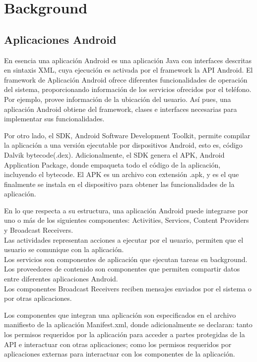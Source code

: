 \section{Background}
\label{sec:back}

\subsection{Aplicaciones Android}
En esencia una aplicación Android es una aplicación Java con interfaces
descritas en sintaxis XML, cuya ejecución es activada por el framework la API
Android.\newline 
El framework de Aplicación Android ofrece diferentes funcionalidades de
operación del sistema, proporcionando información de los servicios ofrecidos por
el teléfono. Por ejemplo, provee información de la ubicación del
usuario.\newline 
Así pues, una aplicación Android obtiene del framework, clases e interfaces
necesarias para implementar sus funcionalidades.

Por otro lado, el SDK, Android Software Development Toolkit, permite compilar
la aplicación a una versión ejecutable por dispositivos Android, esto es, código
Dalvik bytecode(.dex). Adicionalmente, el SDK genera el APK, Android Application
Package, donde empaqueta todo el código de la aplicación, incluyendo el
bytecode. El APK es un archivo con extensión .apk, y es el que finalmente se
instala en el dispositivo para obtener las funcionalidades de la aplicación.

En lo que respecta a su estructura, 
una aplicación Android puede integrarse por uno o más de los siguientes
componentes: Activities, Services, Content Providers y Broadcast Receivers.\\
Las actividades representan acciones a ejecutar por el usuario, permiten que el
usuario se comunique con la aplicación.\\
Los servicios son componentes de aplicación que ejecutan tareas en background.\\
Los proveedores de contenido son componentes que permiten compartir datos entre
diferentes aplicaciones Android.\\
Los componentes Broadcast Receivers reciben mensajes enviados por el sistema o
por otras aplicaciones.

Los componentes que integran una aplicación son especificados en el archivo
manifiesto de la aplicación Manifest.xml\cite{App-Manifest}, donde
adicionalmente se declaran: tanto los permisos requeridos por la aplicación para
acceder a partes protegidas de la API\cite{Android-Permissions} e interactuar
con otras aplicaciones; como los permisos requeridos por aplicaciones
externas para interactuar con los componentes de la aplicación.

